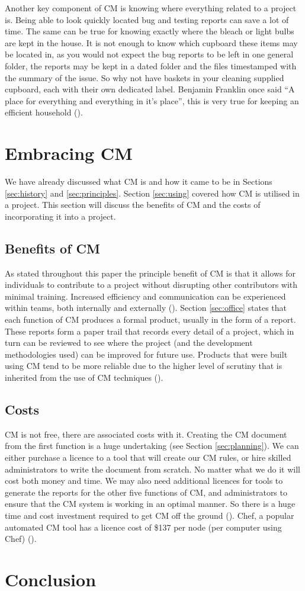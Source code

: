 \documentclass[cmpstyle]{ueacmpstyle}
\begin{document}
		Another key component of CM is knowing where everything related to a project is. Being able to look quickly located bug and testing reports can save a lot of time. The same can be true for knowing exactly where the bleach or light bulbs are kept in the house. It is not enough to know which cupboard these items may be located in, as you would not expect the bug reports to be left in one general folder, the reports may be kept in a dated folder and the files timestamped with the summary of the issue. So why not have baskets in your cleaning supplied cupboard, each with their own dedicated label. Benjamin Franklin once said \enquote{A place for everything and everything in it's place}, this is very true for keeping an efficient household (\cite{cm-at-home}).  
		
	\section{Embracing CM} \label{sec:embracing}
	We have already discussed what CM is and how it came to be in Sections \ref{sec:history} and \ref{sec:principles}. Section \ref{sec:using} covered how CM is utilised in a project. This section will discuss the benefits of CM and the costs of incorporating it into a project. 
	
		\subsection{Benefits of CM} \label{sec:benefits}
		As stated throughout this paper the principle benefit of CM is that it allows for individuals to contribute to a project without disrupting other contributors with minimal training. Increased efficiency and communication can be experienced within teams, both internally and externally (\cite{unexpected-benefits}). Section \ref{sec:office} states that each function of CM produces a formal product, usually in the form of a report. These reports form a paper trail that records every detail of a project, which in turn can be reviewed to see where the project (and the development methodologies used) can be improved for future use. Products that were built using CM tend to be more reliable due to the higher level of scrutiny that is inherited from the use of CM techniques (\cite{benefits}).
		
		\subsection{Costs} \label{sec:costs}
		CM is not free, there are associated costs with it. Creating the CM document from the first function is a huge undertaking (see Section \ref{sec:planning}). We can either purchase a licence to a tool that will create our CM rules, or hire skilled administrators to write the document from scratch. No matter what we do it will cost both money and time. We may also need additional licences for tools to generate the reports for the other five functions of CM, and administrators to ensure that the CM system is working in an optimal manner. So there is a huge time and cost investment required to get CM off the ground (\cite{costs}). Chef, a popular automated CM tool has a licence cost of \$137 per node (per computer using Chef) (\cite{chef-pricing}).
		
	\section{Conclusion} \label{sec:conc}
	
	
	
\end{document}
